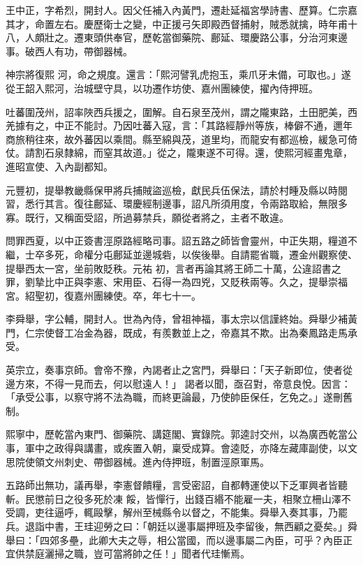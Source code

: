 \begin{pinyinscope}
 王中正，字希烈，開封人。因父任補入內黃門，遷赴延福宮學詩書、歷算。仁宗嘉其才，命置左右。慶歷衛士之變，中正援弓矢即殿西督捕射，賊悉就擒，時年甫十八，人頗壯之。遷東頭供奉官，歷乾當御藥院、鄜延、環慶路公事，分治河東邊事。破西人有功，帶御器械。



 神宗將復熙
 河，命之規度。還言：「熙河譬乳虎抱玉，乘爪牙未備，可取也。」遂從王韶入熙河，治城壁守具，以功遷作坊使、嘉州團練使，擢內侍押班。



 吐蕃圍茂州，詔率陜西兵援之，圍解。自石泉至茂州，謂之隴東路，土田肥美，西羌據有之，中正不能討。乃因吐蕃入寇，言：「其路經靜州等族，棒僻不通，邇年商旅稍往來，故外蕃因以乘間。縣至綿與茂，道里均，而龍安有都巡檢，緩急可倚仗。請割石泉隸綿，而窒其故道。」從之，隴東遂不可得。還，使熙河經畫鬼章，
 進昭宣使、入內副都知。



 元豐初，提舉教畿縣保甲將兵捕賊盜巡檢，獻民兵伍保法，請於村畽及縣以時閱習，悉行其言。復往鄜延、環慶經制邊事，詔凡所須用度，令兩路取給，無限多寡。既行，又稱面受詔，所過募禁兵，願從者將之，主者不敢違。



 問罪西夏，以中正簽書涇原路經略司事。詔五路之師皆會靈州，中正失期，糧道不繼，士卒多死，命權分屯鄜延並邊城砦，以俟後舉。自請罷省職，遷金州觀察使、提舉西太一宮，坐前敗貶秩。元祐
 初，言者再論其將王師二十萬，公違詔書之罪，劉摯比中正與李憲、宋用臣、石得一為四兇，又貶秩兩等。久之，提舉崇福宮。紹聖初，復嘉州團練使。卒，年七十一。



 李舜舉，字公輔，開封人。世為內侍，曾祖神福，事太宗以信謹終始。舜舉少補黃門，仁宗使督工冶金為器，既成，有羨數並上之，帝嘉其不欺。出為秦鳳路走馬承受。



 英宗立，奏事京師。會帝不豫，內謁者止之宮門，舜舉曰：「天子新即位，使者從邊方來，不得一見而去，何以慰遠人！」
 謁者以聞，亟召對，帝意良悅。因言：「承受公事，以察守將不法為職，而終更論最，乃使帥臣保任，乞免之。」遂刪舊制。



 熙寧中，歷乾當內東門、御藥院、講筵閣、實錄院。郭逵討交州，以為廣西乾當公事，軍中之政得與講畫，或疾置入朝，稟受成算。會逵貶，亦降左藏庫副使，以文思院使領文州刺史、帶御器械。進內侍押班，制置涇原軍馬。



 五路師出無功，議再舉，李憲督饋糧，言受密詔，自都轉運使以下乏軍興者皆聽斬。民懲前日之役多死於凍
 餒，皆憚行，出錢百緡不能雇一夫，相聚立柵山澤不受調，吏往逼呼，輒毆擊，解州至械縣令以督之，不能集。舜舉入奏其事，乃罷兵。退詣中書，王珪迎勞之曰：「朝廷以邊事屬押班及李留後，無西顧之憂矣。」舜舉曰：「四郊多壘，此卿大夫之辱，相公當國，而以邊事屬二內臣，可乎？內臣正宜供禁庭灑掃之職，豈可當將帥之任！」聞者代珪慚焉。




\end{pinyinscope}
